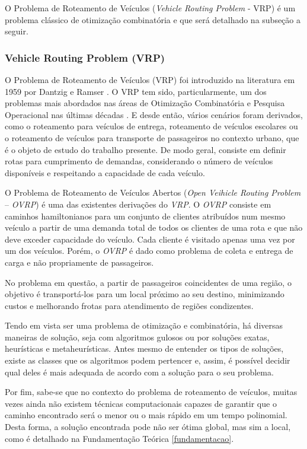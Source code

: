 O Problema de Roteamento de Veículos (\emph{Vehicle Routing Problem} - VRP) é um problema clássico de otimização combinatória e que será detalhado na subseção a seguir.

\subsubsection{Vehicle Routing Problem (VRP)} \label{vrp}

O Problema de Roteamento de Veículos (VRP) foi introduzido na literatura em 1959 por Dantzig e Ramser \cite{toth}. O VRP tem sido, particularmente, um dos problemas mais abordados nas áreas de Otimização Combinatória e Pesquisa Operacional nas últimas décadas \cite{steiner2000problema}. E desde então, vários cenários foram derivados, como o roteamento para veículos de entrega, roteamento de veículos escolares ou o roteamento de veículos para transporte de passageiros no contexto urbano, que é o objeto de estudo do trabalho presente. De modo geral, consiste em definir rotas para cumprimento de demandas, considerando o número de veículos disponíveis e respeitando a capacidade de cada veículo.

O Problema de Roteamento de Veículos Abertos (\emph{Open Veihicle Routing Problem} -- \emph{OVRP}) é uma das existentes derivações do \emph{VRP}. O \emph{OVRP} consiste em caminhos hamiltonianos para um conjunto de clientes atribuídos num mesmo veículo a partir de uma demanda total de todos os clientes de uma rota e que não deve exceder capacidade do veículo. Cada cliente é visitado apenas uma vez por um dos veículos. Porém, o \emph{OVRP} é dado como problema de coleta e entrega de carga e não propriamente de passageiros.

No problema em questão, a partir de passageiros coincidentes de uma região, o objetivo é transportá-los para um local próximo ao seu destino, minimizando custos e melhorando frotas para atendimento de regiões condizentes. 

Tendo em vista ser uma problema de otimização e combinatória, há diversas maneiras de solução, seja com algoritmos gulosos ou por soluções exatas, heurísticas e metaheurísticas. Antes mesmo de entender os tipos de soluções, existe as classes que os algoritmos podem pertencer e, assim, é possível decidir qual deles é mais adequada de acordo com a solução para o seu problema.

Por fim, sabe-se que no contexto do problema de roteamento de veículos, muitas vezes ainda não existem técnicas computacionais capazes de garantir que o caminho encontrado será o menor ou o mais rápido em um tempo polinomial. Desta forma, a solução encontrada pode não ser ótima global, mas sim a local, como é detalhado na Fundamentação Teórica \ref{fundamentacao}.

